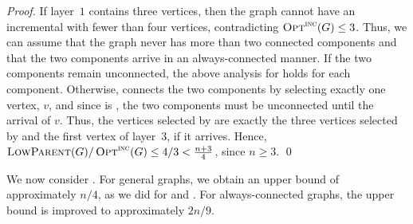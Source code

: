 \begin{proof}
If layer~$1$ contains three vertices, then the graph cannot have an
 incremental \cds with fewer than four vertices, contradicting 
$\operatorname{\textsc{Opt}}^\textsc{\ensuremath{\text{inc}}}(G) \leq 3$.
Thus, we can assume that the graph never has more than two connected
components and that the two components arrive in an always-connected
manner. 
If the two components remain unconnected, the above analysis for \ds
holds for each component.
Otherwise, 
\onopt connects the two components by
selecting exactly one vertex, $v$, and since \onopt is \incr, the
two components must be unconnected until the arrival of $v$.
Thus, the vertices selected by \alayersparent are exactly the three
vertices selected by \onopt and the first vertex of layer~$3$, if it
arrives.
Hence, $\operatorname{\textsc{LowParent}}(G)/\operatorname{\textsc{Opt}}^\textsc{\ensuremath{\text{inc}}}(G) \leq 4/3 < \frac{n+3}{4}$, since
$n \geq 3$.
\qed\end{proof}

We now consider \tds.
For general graphs, we obtain an upper bound of approximately $n/4$,
as we did for \ds and \cds.
For always-connected graphs, the upper bound is improved to
approximately $2n/9$.

